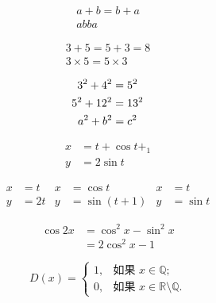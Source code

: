 \documentclass{ctexart}
\begin{document}
	\begin{gather} %
		a + b = b + a \\ %
		ab ba
	\end{gather}

	\begin{gather*}
		3 + 5 = 5 + 3 = 8 \\
		3 \times 5 = 5 \times 3
	\end{gather*}

	\begin{gather} %
		3^2 + 4^2 = 5^2 \notag \\
		5^2 + 12^2 = 13^2 \notag \\
		a^2 + b^2 = c^2
	\end{gather}

	\begin{align}
		x &= t + \cos t +_1 \\
		y &= 2\sin t
	\end{align}

	\begin{align*}
		x	&= t	& x	&= \cos t			& x	&= t		\\
		y	&= 2t	& y	&= \sin(t+1)		& y	&= \sin t
	\end{align*}

	\begin{equation} %
		\begin{split}
			\cos 2x	& = \cos^2 x - \sin^2 x	\\
			& = 2\cos^2 x - 1
		\end{split}
	\end{equation}

	\begin{equation}
		D(x) = \begin{cases}
			1,	& \text{如果 } x \in \mathbb{Q};	\\ %
			0,	& \text{如果 } x \in \mathbb{R}\setminus\mathbb{Q}. %
		\end{cases}
	\end{equation}
\end{document}
